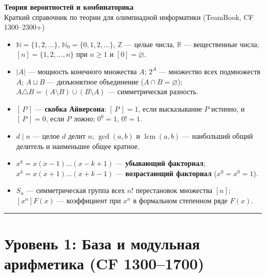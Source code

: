 \documentclass[10pt,a4paper]{article}
\renewcommand{\ge}{\geqslant}
\renewcommand{\emptyset}{\varnothing}
\newcommand{\N}{\mathbb{N}}
\newcommand{\Z}{\mathbb{Z}}
\newcommand{\R}{\mathbb{R}}
\newcommand{\iverson}[1]{[\,#1\,]}
\newcommand{\fall}[2]{#1^{\underline{#2}}}
\newcommand{\rise}[2]{#1^{\overline{#2}}}
\DeclareMathOperator{\lcm}{lcm}
\begin{document}
\thispagestyle{plain}

\begin{center}
  {\LARGE\bfseries\color{AccentBlue} Теория вероятностей и комбинаторика}\\[4pt]
  {\normalsize Краткий справочник по теории для олимпиадной информатики (TeamBook, CF 1300--2300+)}
\end{center}
\vspace{2pt}

\begin{summarybox}[title={Базовые обозначения и соглашения}]
\begin{itemize}
  \item $\N = \{1, 2, \dots\}$, $\N_0 = \{0, 1, 2, \dots\}$, $\Z$ — целые числа, $\R$ — вещественные числа; $[n] = \{1, 2, \dots, n\}$ при $n \ge 1$ и $[0] = \emptyset$.
  \item $|A|$ — мощность конечного множества $A$; $2^A$ — множество всех подмножеств $A$; $A \sqcup B$ — дизъюнктное объединение ($A \cap B = \emptyset$); $A \triangle B = (A \setminus B) \cup (B \setminus A)$ — симметрическая разность.
  \item $\iverson{P}$ — \textbf{скобка Айверсона}: $\iverson{P} = 1$, если высказывание $P$ истинно, и $\iverson{P} = 0$, если $P$ ложно; $0^0 = 1$, $0! = 1$.
  \item $d \mid n$ — целое $d$ делит $n$; $\gcd(a, b)$ и $\lcm(a, b)$ — наибольший общий делитель и наименьшее общее кратное.
  \item $\fall{x}{k} = x(x-1)\dots(x-k+1)$ — \textbf{убывающий факториал}; $\rise{x}{k} = x(x+1)\dots(x+k-1)$ — \textbf{возрастающий факториал} ($\fall{x}{0} = \rise{x}{0} = 1$).
  \item $S_n$ — симметрическая группа всех $n!$ перестановок множества $[n]$; $[x^n] F(x)$ — коэффициент при $x^n$ в формальном степенном ряде $F(x)$.
\end{itemize}
\end{summarybox}

{\small\tableofcontents}
\vspace{4pt}
\hrule
\vspace{6pt}

\section{Уровень 1: База и модульная арифметика (CF 1300--1700)}
\end{document}
